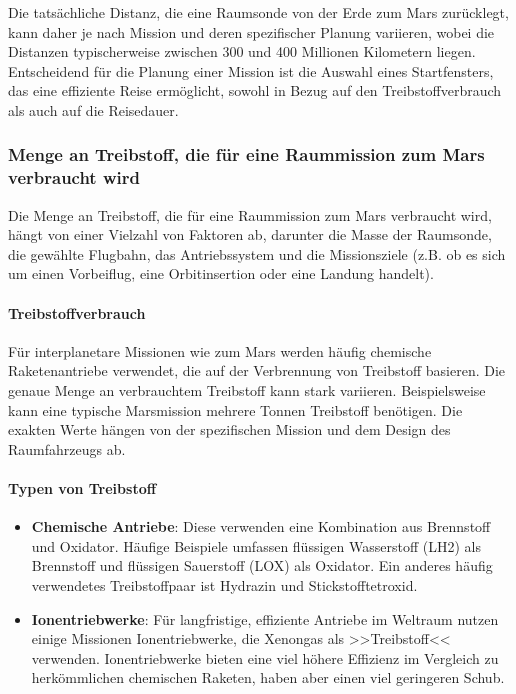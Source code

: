 \documentclass{vorlage-design-main}
\begin{document}
Die tatsächliche Distanz, die eine Raumsonde von der Erde zum Mars
zurücklegt, kann daher je nach Mission und deren spezifischer Planung
variieren, wobei die Distanzen typischerweise zwischen 300 und 400
Millionen Kilometern liegen. Entscheidend für die Planung einer Mission
ist die Auswahl eines Startfensters, das eine effiziente Reise
ermöglicht, sowohl in Bezug auf den Treibstoffverbrauch als auch auf die
Reisedauer.

\hypertarget{menge-an-treibstoff-die-fuxfcr-eine-raummission-zum-mars-verbraucht-wird}{%
\subsubsection{Menge an Treibstoff, die für eine Raummission zum Mars
verbraucht
wird}\label{menge-an-treibstoff-die-fuer-eine-raummission-zum-mars-verbraucht-wird}}

Die Menge an Treibstoff, die für eine Raummission zum Mars verbraucht
wird, hängt von einer Vielzahl von Faktoren ab, darunter die Masse der
Raumsonde, die gewählte Flugbahn, das Antriebssystem und die
Missionsziele (z.B. ob es sich um einen Vorbeiflug, eine Orbitinsertion
oder eine Landung handelt).

\hypertarget{treibstoffverbrauch}{%
\paragraph{Treibstoffverbrauch}\label{treibstoffverbrauch}}

Für interplanetare Missionen wie zum Mars werden häufig chemische
Raketenantriebe verwendet, die auf der Verbrennung von Treibstoff
basieren. Die genaue Menge an verbrauchtem Treibstoff kann stark
variieren. Beispielsweise kann eine typische Marsmission mehrere Tonnen
Treibstoff benötigen. Die exakten Werte hängen von der spezifischen
Mission und dem Design des Raumfahrzeugs ab.

\hypertarget{typen-von-treibstoff}{%
\paragraph{Typen von Treibstoff}\label{typen-von-treibstoff}}

\begin{itemize}

\item
  \textbf{Chemische Antriebe}: Diese verwenden eine Kombination aus
  Brennstoff und Oxidator. Häufige Beispiele umfassen flüssigen
  Wasserstoff (LH2) als Brennstoff und flüssigen Sauerstoff (LOX) als
  Oxidator. Ein anderes häufig verwendetes Treibstoffpaar ist Hydrazin
  und Stickstofftetroxid.
\item
  \textbf{Ionentriebwerke}: Für langfristige, effiziente Antriebe im
  Weltraum nutzen einige Missionen Ionentriebwerke, die Xenongas als
  >>Treibstoff<< verwenden. Ionentriebwerke bieten eine viel höhere
  Effizienz im Vergleich zu herkömmlichen chemischen Raketen, haben aber
  einen viel geringeren Schub.
\end{itemize}
\end{document}

